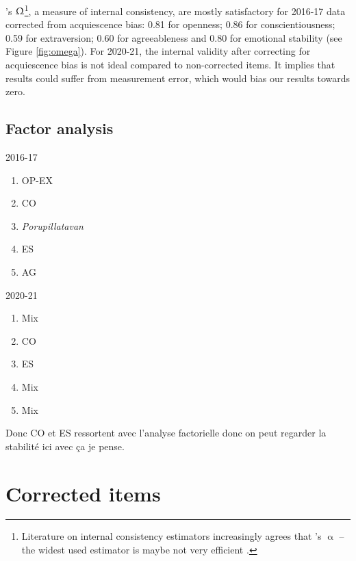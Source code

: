 \documentclass[a4paper, 12pt, onecolumn]{article}
\begin{document}
\citeauthor{McDonald1999}'s $\Upomega$\footnote{Literature on internal consistency estimators increasingly agrees that \citeauthor{Cronbach1951}'s $\upalpha$ --the widest used estimator is maybe not very efficient \citep{Bourque2019, TrizanoHermosilla2016}.}, a measure of internal consistency, are mostly satisfactory for 2016-17 data corrected from acquiescence bias: 0.81 for openness; 0.86 for conscientiousness; 0.59 for extraversion; 0.60 for agreeableness and 0.80 for emotional stability (see Figure \ref{fig:omega}).
For 2020-21, the internal validity after correcting for acquiescence bias is not ideal compared to non-corrected items.
It implies that results could suffer from measurement error, which would bias our results towards zero.



	\subsection{Factor analysis}

2016-17
\begin{enumerate}
\item OP-EX
\item CO
\item \textit{Porupillatavan}
\item ES
\item AG
\end{enumerate}

2020-21
\begin{enumerate}
\item Mix
\item CO
\item ES
\item Mix
\item Mix
\end{enumerate}

Donc CO et ES ressortent avec l'analyse factorielle donc on peut regarder la stabilité ici avec ça je pense.


\clearpage
\newpage
\section{Corrected items}
\end{document}
